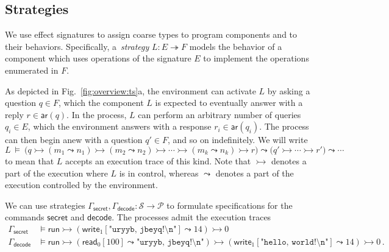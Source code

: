 \documentclass[acmsmall,screen,review,nonacm]{acmart}
\newcommand{\kw}[1]{\ensuremath{ \mathsf{#1} }}
\begin{document}
\subsection{Strategies} \label{sec:strat} %

We use effect signatures to assign coarse types
to program components and to their behaviors.
Specifically,
a~\emph{strategy} $L : E \twoheadrightarrow F$
models the behavior of a component which
uses operations of the signature $E$ to
implement the operations enumerated in $F$.

As depicted in Fig.~\ref{fig:overview:ts}a,
the environment can activate $L$ by asking a question $q \in F$,
which the component $L$ is expected to eventually answer
with a reply $r \in \kw{ar}(q)$.
In the process,
$L$ can perform an arbitrary number of queries $q_i \in E$,
which the environment answers with a response $r_i \in \kw{ar}(q_i)$.
The process can then begin anew with a question $q' \in F$,
and so on indefinitely.
We will write
\[
  L \:\vDash\: \big(q
    \rightarrowtail (m_1 \leadsto n_1)
    \rightarrowtail (m_2 \leadsto n_2)
    \rightarrowtail \cdots
    \rightarrowtail (m_k \leadsto n_k)
    \rightarrowtail r \big)
  \leadsto \big(q'
    \rightarrowtail \cdots
    \rightarrowtail r' \big)
  \leadsto \cdots
\]
to mean that $L$ accepts an execution trace of this kind.
Note that $\rightarrowtail$ denotes a part of the execution
where $L$ is in control,
whereas $\leadsto$ denotes a part of the execution
controlled by the environment.

\begin{example} \label{ex:decodespec} %
We can use strategies $\Gamma_\kw{secret}, \Gamma_\kw{decode} : \mathcal{S} \rightarrow \mathcal{P}$
to formulate specifications for the commands $\kw{secret}$ and $\kw{decode}$.
The processes admit the execution traces
{\small\begin{align*}
  \Gamma_\kw{secret} &\vDash \kw{run}
    \rightarrowtail (\kw{write}_1[\texttt{"uryyb, jbeyq!\textbackslash{}n"}] \leadsto 14)
    \rightarrowtail 0
  \\
  \Gamma_\kw{decode} &\vDash \kw{run}
    \rightarrowtail (\kw{read}_0[100] \leadsto \texttt{"uryyb, jbeyq!\textbackslash{}n"})
    \rightarrowtail (\kw{write}_1[\texttt{"hello, world!\textbackslash{}n"}] \leadsto 14)
    \rightarrowtail 0
  \,.
\end{align*}}
\end{example}
\end{document}
